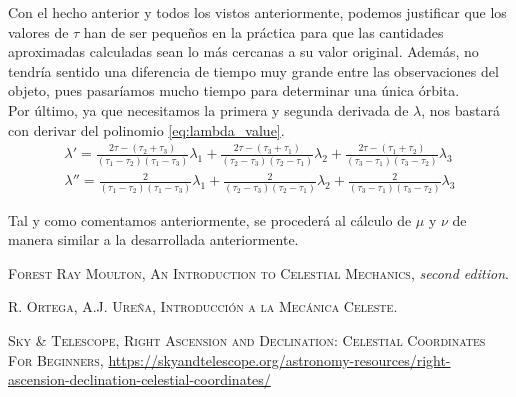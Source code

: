 \documentclass[11pt]{article}
\begin{document}
Con el hecho anterior y todos los vistos anteriormente, podemos justificar que los valores de $\tau$ han de ser pequeños en la práctica para que las cantidades aproximadas calculadas sean lo más cercanas a su valor original. Además, no tendría sentido una diferencia de tiempo muy grande entre las observaciones del objeto, pues pasaríamos mucho tiempo para determinar una única órbita.\\

Por último, ya que necesitamos la primera y segunda derivada de $\lambda$, nos bastará con derivar del polinomio \eqref{eq:lambda_value}.
\begin{align*}
\lambda' = \frac{2\tau-(\tau_2+\tau_3)}{(\tau_1-\tau_2)(\tau_1-\tau_3)}\lambda_1
+\frac{2\tau-(\tau_3+\tau_1)}{(\tau_2-\tau_3)(\tau_2-\tau_1)}\lambda_2
+\frac{2\tau-(\tau_1+\tau_2)}{(\tau_3-\tau_1)(\tau_3-\tau_2)}\lambda_3\\
\lambda'' = \frac{2}{(\tau_1-\tau_2)(\tau_1-\tau_3)}\lambda_1
+\frac{2}{(\tau_2-\tau_3)(\tau_2-\tau_1)}\lambda_2
+\frac{2}{(\tau_3-\tau_1)(\tau_3-\tau_2)}\lambda_3
\end{align*}

Tal y como comentamos anteriormente, se procederá al cálculo de $\mu$ y $\nu$ de manera similar a la desarrollada anteriormente.\\






\newpage

\begin{thebibliography}{99}
 \textsc{Forest Ray Moulton}, \textsc{An Introduction to Celestial Mechanics}, \textit{second edition}.

 \textsc{R. Ortega, A.J. Ureña}, \textsc{Introducción a la Mecánica Celeste}.

 \textsc{Sky \& Telescope}, \textsc{Right Ascension and Declination: Celestial Coordinates For Beginners}, \url{https://skyandtelescope.org/astronomy-resources/right-ascension-declination-celestial-coordinates/}

\end{thebibliography}
\end{document}
